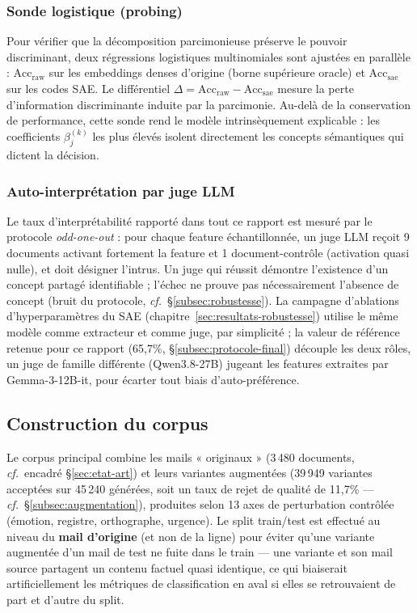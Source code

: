 \documentclass[11pt]{article}
\begin{document}
\subsubsection{Sonde logistique (probing)}
Pour vérifier que la décomposition parcimonieuse préserve le pouvoir
discriminant, deux régressions logistiques multinomiales sont ajustées en
parallèle : $\text{Acc}_\text{raw}$ sur les embeddings denses d'origine
(borne supérieure oracle) et $\text{Acc}_\text{sae}$ sur les codes SAE. Le
différentiel $\Delta = \text{Acc}_\text{raw} - \text{Acc}_\text{sae}$ mesure
la perte d'information discriminante induite par la parcimonie. Au-delà de la
conservation de performance, cette sonde rend le modèle intrinsèquement
explicable : les coefficients $\beta_j^{(k)}$ les plus élevés isolent
directement les concepts sémantiques qui dictent la décision.

\subsubsection{Auto-interprétation par juge LLM}
Le taux d'interprétabilité rapporté dans tout ce rapport est mesuré par le
protocole \emph{odd-one-out} \cite{karvonen2025saebench} : pour chaque feature échantillonnée, un juge LLM
reçoit 9 documents activant fortement la feature et 1 document-contrôle
(activation quasi nulle), et doit désigner l'intrus. Un juge qui réussit
démontre l'existence d'un concept partagé identifiable ; l'échec ne prouve pas
nécessairement l'absence de concept (bruit du protocole,
\emph{cf.}~\S\ref{subsec:robustesse}). La campagne d'ablations
d'hyperparamètres du SAE (chapitre~\ref{sec:resultats-robustesse}) utilise le même modèle comme
extracteur et comme juge, par simplicité ; la valeur de référence retenue
pour ce rapport (65,7\%, \S\ref{subsec:protocole-final}) découple les deux
rôles, un juge de famille différente (Qwen3.8-27B) jugeant les features
extraites par Gemma-3-12B-it, pour écarter tout biais d'auto-préférence.

\subsection{Construction du corpus}

Le corpus principal combine les mails « originaux » (3\,480 documents,
\emph{cf.}~encadré \S\ref{sec:etat-art}) et leurs variantes augmentées
(39\,949 variantes acceptées sur 45\,240 générées, soit un taux de rejet de
qualité de 11,7\% --- \emph{cf.}~\S\ref{subsec:augmentation}), produites selon
13 axes de perturbation contrôlée (émotion, registre, orthographe, urgence).
Le split train/test est effectué au niveau du \textbf{mail d'origine} (et non
de la ligne) pour éviter qu'une variante augmentée d'un mail de test ne fuite
dans le train --- une variante et son mail source partagent un contenu
factuel quasi identique, ce qui biaiserait artificiellement les métriques de
classification en aval si elles se retrouvaient de part et d'autre du split.
\end{document}
